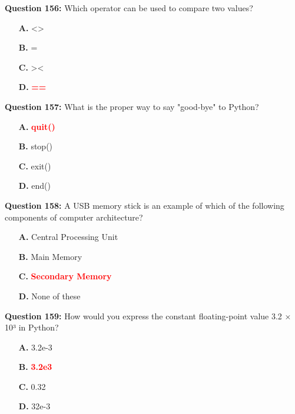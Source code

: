 \documentclass[12pt,a4paper]{article}
\begin{document}
\vspace{0.5cm}

\textbf{Question 156:} Which operator can be used to compare two values?

\begin{itemize}
    \item[\textbf{A.}] <>
    \item[\textbf{B.}] =
    \item[\textbf{C.}] ><
    \item[\textbf{D.}] \textcolor{red}{\textbf{==}}
\end{itemize}

\vspace{0.5cm}

\textbf{Question 157:} What is the proper way to say "good-bye" to Python?

\begin{itemize}
    \item[\textbf{A.}] \textcolor{red}{\textbf{quit()}}
    \item[\textbf{B.}] stop()
    \item[\textbf{C.}] exit()
    \item[\textbf{D.}] end()
\end{itemize}

\vspace{0.5cm}

\textbf{Question 158:} A USB memory stick is an example of which of the following components of computer architecture?

\begin{itemize}
    \item[\textbf{A.}] Central Processing Unit
    \item[\textbf{B.}] Main Memory
    \item[\textbf{C.}] \textcolor{red}{\textbf{Secondary Memory}}
    \item[\textbf{D.}] None of these
\end{itemize}

\vspace{0.5cm}

\textbf{Question 159:} How would you express the constant floating-point value 3.2 × 10³ in Python?

\begin{itemize}
    \item[\textbf{A.}] 3.2e-3
    \item[\textbf{B.}] \textcolor{red}{\textbf{3.2e3}}
    \item[\textbf{C.}] 0.32
    \item[\textbf{D.}] 32e-3
\end{itemize}
\end{document}
